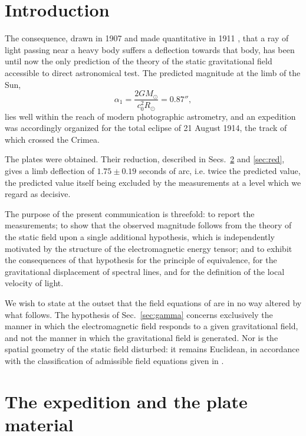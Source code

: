 \documentclass[aps,prd,reprint,amsmath,amssymb,nofootinbib,longbibliography]{revtex4-2}
\begin{document}
\section{Introduction}

The consequence, drawn in 1907 \cite{ein1907} and made quantitative in 1911 \cite{ein1911}, that a
ray of light passing near a heavy body suffers a deflection towards that body, has been until now
the only prediction of the theory of the static gravitational field accessible to direct
astronomical test. The predicted magnitude at the limb of the Sun,
\begin{equation}
\alpha_1 = \frac{2GM_\odot}{c_0^{2} R_\odot} = 0.87'' ,
\label{eq:alpha1}
\end{equation}
lies well within the reach of modern photographic astrometry, and an expedition was accordingly
organized for the total eclipse of 21 August 1914, the track of which crossed the Crimea.

The plates were obtained. Their reduction, described in Secs.~\ref{sec:plates} and \ref{sec:red},
gives a limb deflection of $1.75 \pm 0.19$ seconds of arc, i.e. twice the predicted value, the
predicted value itself being excluded by the measurements at a level which we regard as decisive.

The purpose of the present communication is threefold: to report the measurements; to show that the
observed magnitude follows from the theory of the static field upon a single additional
hypothesis, which is independently motivated by the structure of the electromagnetic
energy tensor; and to exhibit the consequences of that hypothesis for the principle of
equivalence, for the gravitational displacement of spectral lines, and for the definition of the
local velocity of light.

We wish to state at the outset that the field equations of \cite{eingross1913} are in no way
altered by what follows. The hypothesis of Sec.~\ref{sec:gamma} concerns exclusively the manner in
which the electromagnetic field responds to a given gravitational field, and not the manner in which
the gravitational field is generated. Nor is the spatial geometry of the static field disturbed: it
remains Euclidean, in accordance with the classification of admissible field equations given in
\cite{paperD}.

\section{The expedition and the plate material}
\label{sec:plates}
\end{document}
